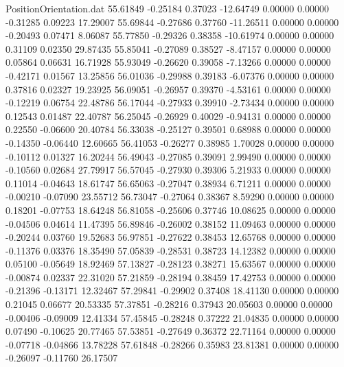 \begin{filecontents}{PositionOrientation.dat}
  55.61849   -0.25184    0.37023   -12.64749    0.00000    0.00000   -0.31285    0.09223   17.29007
  55.69844   -0.27686    0.37760   -11.26511    0.00000    0.00000   -0.20493    0.07471    8.06087
  55.77850   -0.29326    0.38358   -10.61974    0.00000    0.00000    0.31109    0.02350   29.87435
  55.85041   -0.27089    0.38527    -8.47157    0.00000    0.00000    0.05864    0.06631   16.71928
  55.93049   -0.26620    0.39058    -7.13266    0.00000    0.00000   -0.42171    0.01567   13.25856
  56.01036   -0.29988    0.39183    -6.07376    0.00000    0.00000    0.37816    0.02327   19.23925
  56.09051   -0.26957    0.39370    -4.53161    0.00000    0.00000   -0.12219    0.06754   22.48786
  56.17044   -0.27933    0.39910    -2.73434    0.00000    0.00000    0.12543    0.01487   22.40787
  56.25045   -0.26929    0.40029    -0.94131    0.00000    0.00000    0.22550   -0.06600   20.40784
  56.33038   -0.25127    0.39501     0.68988    0.00000    0.00000   -0.14350   -0.06440   12.60665
  56.41053   -0.26277    0.38985     1.70028    0.00000    0.00000   -0.10112    0.01327   16.20244
  56.49043   -0.27085    0.39091     2.99490    0.00000    0.00000   -0.10560    0.02684   27.79917
  56.57045   -0.27930    0.39306     5.21933    0.00000    0.00000    0.11014   -0.04643   18.61747
  56.65063   -0.27047    0.38934     6.71211    0.00000    0.00000   -0.00210   -0.07090   23.55712
  56.73047   -0.27064    0.38367     8.59290    0.00000    0.00000    0.18201   -0.07753   18.64248
  56.81058   -0.25606    0.37746    10.08625    0.00000    0.00000   -0.04506    0.04614   11.47395
  56.89846   -0.26002    0.38152    11.09463    0.00000    0.00000   -0.20244    0.03760   19.52683
  56.97851   -0.27622    0.38453    12.65768    0.00000    0.00000   -0.11376    0.03376   18.35490
  57.05839   -0.28531    0.38723    14.12382    0.00000    0.00000    0.05100   -0.05649   18.92469
  57.13827   -0.28123    0.38271    15.63567    0.00000    0.00000   -0.00874    0.02337   22.31020
  57.21859   -0.28194    0.38459    17.42753    0.00000    0.00000   -0.21396   -0.13171   12.32467
  57.29841   -0.29902    0.37408    18.41130    0.00000    0.00000    0.21045    0.06677   20.53335
  57.37851   -0.28216    0.37943    20.05603    0.00000    0.00000   -0.00406   -0.09009   12.41334
  57.45845   -0.28248    0.37222    21.04835    0.00000    0.00000    0.07490   -0.10625   20.77465
  57.53851   -0.27649    0.36372    22.71164    0.00000    0.00000   -0.07718   -0.04866   13.78228
  57.61848   -0.28266    0.35983    23.81381    0.00000    0.00000   -0.26097   -0.11760   26.17507

\end{filecontents}
